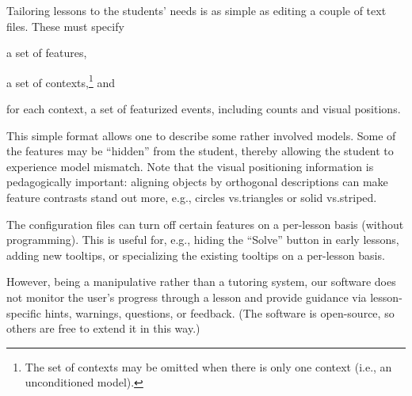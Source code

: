 \documentclass[11pt,letterpaper]{article}
\newcommand{\Note}[1]{}
\newcommand{\NoteSigned}[3]{{\sethlcolor{#2}\Note{#1: #3}}}
\newcommand{\NoteFF}[1]{\NoteSigned{FF}{LightBlue}{#1}}
\newcommand{\NoteJE}[1]{\NoteSigned{JE}{LightGreen}{#1}}
\begin{document}
Tailoring lessons to the students' needs is as simple as editing a
couple of text files. These must specify
\begin{inparaenum}[(1)]
\item a set of features, 
\item a set of contexts,\footnote{The set of contexts may be omitted
    when there is only one context (i.e., an unconditioned model).}
  and
\item for each context, a set of 
featurized events, including counts and visual positions.
\end{inparaenum}
This simple format allows one to describe some rather involved
models.  Some of the features may be ``hidden'' from the student, thereby allowing the student to experience 
model mismatch.  Note that the visual positioning information is pedagogically 
important: aligning objects by orthogonal descriptions can make feature contrasts stand out more, 
e.g., circles vs.\@ triangles or solid vs.\@ striped.

The configuration files can turn off certain features on a per-lesson basis (without programming).  This is 
useful for, e.g., hiding the ``Solve'' button in early lessons, adding new tooltips, or specializing
the existing tooltips on a per-lesson basis.

However, being a manipulative rather than a tutoring system, our
software does not monitor the user's progress through a lesson and
provide guidance via lesson-specific hints, warnings, questions, or
feedback.  (The software is open-source, so others are free to extend
it in this way.)

\end{document}
